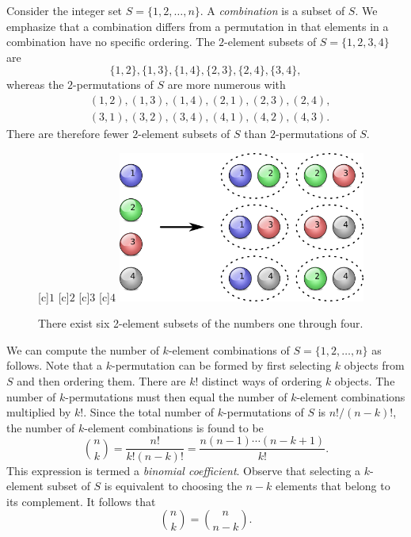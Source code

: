 Consider the integer set $S = \{ 1, 2, \ldots, n \}$.
A \emph{combination} is a subset of $S$. 
We emphasize that a combination differs from a permutation in that elements in a combination have no specific ordering.
The $2$-element subsets of $S = \{ 1, 2, 3, 4 \}$ are
\begin{equation*}
\{ 1, 2 \}, \{ 1, 3 \}, \{ 1, 4 \}, \{ 2, 3 \}, \{ 2, 4 \}, \{ 3, 4 \} ,
\end{equation*}
whereas the $2$-permutations of $S$ are more numerous with
\begin{equation*}
\begin{split}
&( 1, 2 ), ( 1, 3 ), ( 1, 4 ), ( 2, 1 ), ( 2, 3 ), ( 2, 4 ), \\
&( 3, 1 ), ( 3, 2 ), ( 3, 4 ), ( 4, 1 ), ( 4, 2 ), ( 4, 3 ) .
\end{split}
\end{equation*}
There are therefore fewer $2$-element subsets of $S$ than $2$-permutations of $S$.

\begin{figure}[htb!]
\begin{center}
\begin{psfrags}
[c]{$1$}
[c]{$2$}
[c]{$3$}
[c]{$4$}
\includegraphics[height=4.95cm]{Figures/4Chapter/combination}
\end{psfrags}
\caption{There exist six 2-element subsets of the numbers one through four.}
\label{figure:Combination}
\end{center}
\end{figure}

We can compute the number of $k$-element combinations of $S = \{ 1, 2, \ldots, n \}$ as follows.
Note that a $k$-permutation can be formed by first selecting $k$ objects from $S$ and then ordering them.
There are $k!$ distinct ways of ordering $k$ objects.
The number of $k$-permutations must then equal the number of $k$-element combinations multiplied by $k!$.
Since the total number of $k$-permutations of $S$ is $n! / (n-k)!$, the number of $k$-element combinations is found to be
\begin{equation*}
\binom{n}{k} = \frac{n!}{k! (n-k)!} = \frac{ n (n-1) \cdots (n-k+1) }{ k! } .
\end{equation*}
This expression is termed a \emph{binomial coefficient}. 
Observe that selecting a $k$-element subset of $S$ is equivalent to choosing the $n-k$ elements that belong to its complement.
It follows that
\begin{equation*}
\binom{n}{k} = \binom{n}{n-k} .
\end{equation*}


